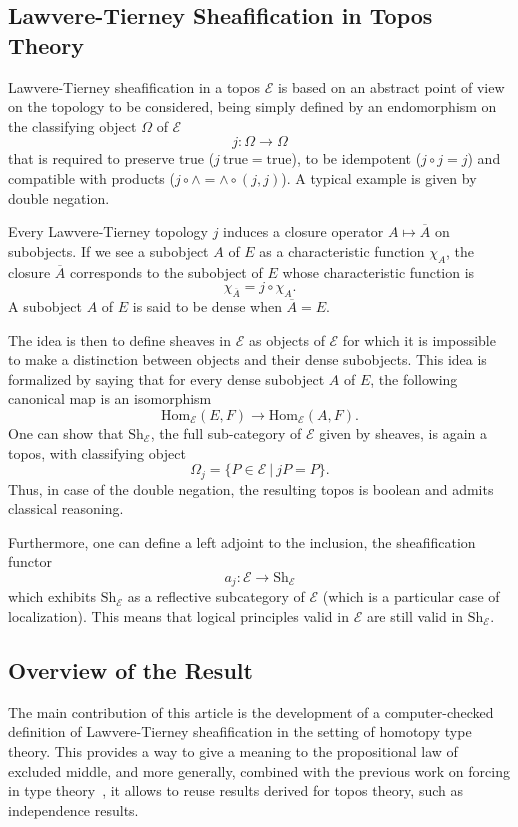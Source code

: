 \documentclass[conference]{IEEEtran}
\newcommand \True {\mathrm{true}}
\newcommand \closure[1] {\overline{#1}}
\newcommand \Char[1] {\chi_{#1}}%
\newcommand \E {\mathcal{E}}
\newcommand \Hom[1] {\mathrm{Hom}_{#1}}
\newcommand \Sh[1] {\mathrm{Sh}_{#1}}
\begin{document}
\subsection{Lawvere-Tierney Sheafification in Topos Theory}
\label{sec:lawv-tiern-sheaf}

Lawvere-Tierney sheafification in a topos $\E$ is based on an abstract
point of view on the topology to be considered, being simply defined by an
endomorphism on the classifying object $\Omega$ of $\E$  
%
$$
j : \Omega \rightarrow \Omega
$$
%
that is required to preserve $\True$ ($j \ \True = \True$), to be
idempotent ($j \circ j = j$) and compatible with products ($j \circ
\wedge = \wedge \circ (j, j)$).
%
A typical example is given by double negation.

Every Lawvere-Tierney topology $j$ induces a closure operator
$A \mapsto \closure{A}$ on subobjects. If we see a subobject $A$ of $E$
as a characteristic function $\Char{A}$, the closure $\closure{A}$
corresponds to the subobject of $E$ whose characteristic function is 
%
$$
\Char{\closure{A}} = j \circ \Char{A}.
$$
%
A subobject $A$ of $E$ is said to
be dense when $\closure{A} = E$.

The idea is then to define sheaves in $\E$ as objects of $\E$ for
which it is impossible to make a distinction between objects and their
dense subobjects. This idea is formalized by saying that for every
dense subobject $A$ of $E$, the following canonical map is an
isomorphism
%
\begin{equation}\label{equ:sheaf_def}
\Hom{\E}(E,F) \rightarrow \Hom{\E}(A,F).
\end{equation}
%
One can show that $\Sh{\E}$, the full sub-category of $\E$ given by
sheaves, is again a topos, with classifying object
%
$$
\Omega_j = \{ P \in \E \ | \ j P  = P \}.
$$
%
Thus, in case of the double negation, the resulting topos is boolean  
and admits classical reasoning.

Furthermore, one can define a left adjoint to the inclusion, the
sheafification functor
%
$$
a_j : \E \rightarrow \Sh{\E}
$$
which exhibits $\Sh{\E}$ as a reflective
subcategory of $\E$ (which is a particular case of localization). This
means that logical principles valid in $\E$ are still valid in
$\Sh{\E}$.


\subsection{Overview of the Result}

The main contribution of this article is the development of a
computer-checked definition of Lawvere-Tierney sheafification in the
setting of homotopy type theory.
%
This provides a way to give a meaning to the propositional law of
excluded middle, and more generally, combined with the previous work on
forcing in type theory~\cite{jaber2012extending}, it allows to reuse
results derived for topos theory, such as independence results.
\end{document}
